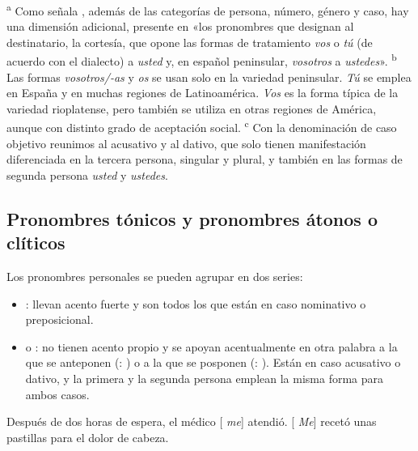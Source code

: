 \begin{table}[htbp]
\medskip
\begin{minipage}{\linewidth}\scriptsize
\textsuperscript{a} Como señala \textcite[169]{ditullio2014}, además de las
categorías de persona, número, género y caso, hay una dimensión adicional,
presente en «los pronombres que designan al destinatario, la cortesía, que opone
las formas de tratamiento \textit{vos} o \textit{tú} (de acuerdo con el dialecto)
a \textit{usted} y, en español peninsular, \textit{vosotros} a \textit{ustedes}».
\textsuperscript{b} Las formas \textit{vosotros/-as} y \textit{os} se usan solo
en la variedad peninsular. \textit{Tú} se emplea en España y en muchas regiones
de Latinoamérica. \textit{Vos} es la forma típica de la variedad rioplatense,
pero también se utiliza en otras regiones de América, aunque con distinto grado
de aceptación social. \textsuperscript{c} Con la denominación de caso objetivo
reunimos al acusativo y al dativo, que solo tienen manifestación diferenciada en
la tercera persona, singular y plural, y también en las formas de segunda
persona \textit{usted} y \textit{ustedes}.
\end{minipage}
\end{table}

\subsection{Pronombres tónicos y pronombres átonos o clíticos}\label{sec:10-tonicos}

Los pronombres personales se pueden agrupar en dos series:

\begin{itemize}
  \item {}: llevan acento fuerte y son todos los que están en
        caso nominativo o preposicional.
  \item {} o : no tienen acento propio y se
        apoyan acentualmente en otra palabra a la que se anteponen
        (: ) o a la que
        se posponen (: ). Están en caso acusativo o dativo, y la
        primera y la segunda persona emplean la misma forma para ambos casos.
\end{itemize}

\begin{exe}
  \ex Después de dos horas de espera, el médico [ \textit{me}]
      atendió.
  \ex {}[ \textit{Me}] recetó unas pastillas para el dolor de
      cabeza.
\end{exe}

